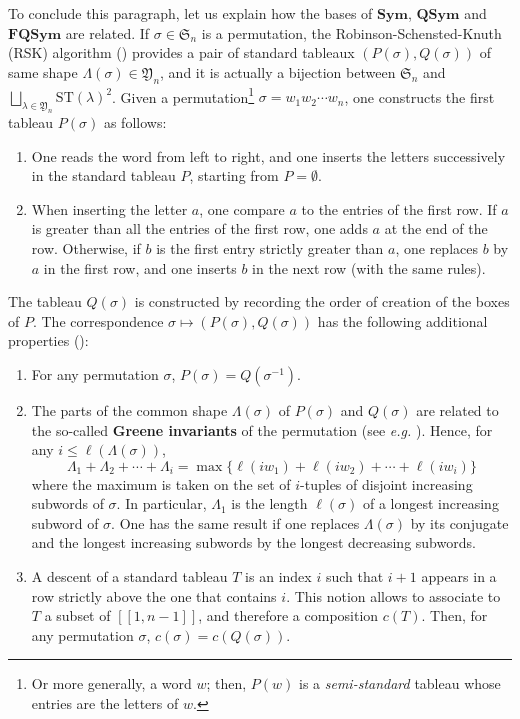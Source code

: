 \documentclass[smallextended,nospthms]{svjour3}
\theoremstyle{remark}
\newcommand{\sym}{\mathfrak{S}}
\newcommand{\Sym}{\mathbf{Sym}}
\newcommand{\QSym}{\mathbf{QSym}}
\newcommand{\FQSym}{\mathbf{FQSym}}
\newcommand{\ym}{\mathfrak{Y}}
\newcommand{\lle}{\left[\!\left[}
\newcommand{\rre}{\right]\!\right]}
\begin{document}
To conclude this paragraph, let us explain how the bases of $\Sym$, $\QSym$ and $\FQSym$ are related. If $\sigma \in \sym_{n}$ is a permutation, the Robinson-Schensted-Knuth (RSK) algorithm (\cite{Rob38,Sch61}) provides a pair of standard tableaux $(P(\sigma),Q(\sigma))$ of same shape $\Lambda(\sigma) \in \ym_{n}$, and it is actually a bijection between $\sym_{n}$ and $\bigsqcup_{\lambda \in \ym_{n}}\mathrm{ST}(\lambda)^{2}$. Given a permutation\footnote{Or more generally, a word $w$; then, $P(w)$ is a \emph{semi-standard} tableau whose entries are the letters of $w$.} $\sigma=w_{1}w_{2}\cdots w_{n}$, one constructs the first tableau $P(\sigma)$ as follows:\vspace{2mm}
\begin{enumerate}
\item One reads the word from left to right, and one inserts the letters successively in the standard tableau $P$, starting from $P=\emptyset$.\vspace{2mm}
\item When inserting the letter $a$, one compare $a$ to the entries of the first row. If $a$ is greater than all the entries of the first row, one adds $a$ at the end of the row. Otherwise, if $b$ is the first entry strictly greater than $a$, one replaces $b$ by $a$ in the first row, and one inserts $b$ in the next row (with the same rules).\vspace{2mm}
\end{enumerate}
The tableau $Q(\sigma)$ is constructed by recording the order of creation of the boxes of $P$. The correspondence $\sigma \mapsto (P(\sigma),Q(\sigma))$ has the following additional properties (\cite{Ful97}):\vspace{2mm}
\begin{enumerate}
\item For any permutation $\sigma$, $P(\sigma)=Q(\sigma^{-1})$.\vspace{2mm}
\item The parts of the common shape $\Lambda(\sigma)$ of $P(\sigma)$ and $Q(\sigma)$ are related to the so-called \textbf{Greene invariants} of the permutation (see \emph{e.g.} \cite{LLT02}). Hence, for any $i \leq \ell(\Lambda(\sigma))$,
$$\Lambda_{1}+\Lambda_{2}+\cdots+\Lambda_{i}=\max\{\ell(iw_{1})+\ell(iw_{2})+\cdots+\ell(iw_{i})\}$$
where the maximum is taken on the set of $i$-tuples of disjoint increasing subwords of $\sigma$. In particular, $\Lambda_{1}$ is the length $\ell(\sigma)$ of a longest increasing subword of $\sigma$. One has the same result if one replaces $\Lambda(\sigma)$ by its conjugate and the longest increasing subwords by the longest decreasing subwords.\vspace{2mm}
\item A descent of a standard tableau $T$ is an index $i$ such that $i+1$ appears in a row strictly above the one that contains $i$. This notion allows to associate to $T$ a subset of $\lle 1,n-1\rre$, and therefore a composition $c(T)$. Then, for any permutation $\sigma$, $c(\sigma)=c(Q(\sigma))$.\vspace{2mm}
\end{enumerate}
\end{document}
